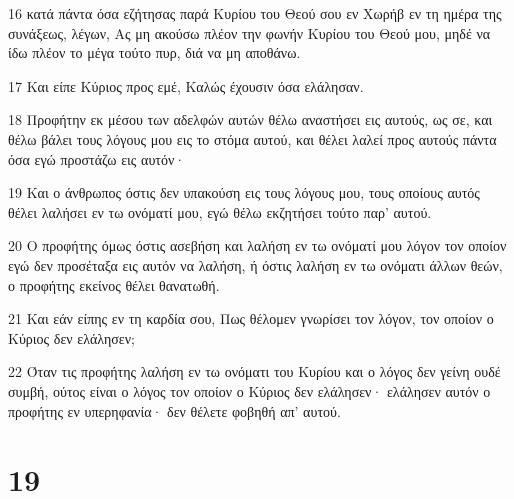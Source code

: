 \par 16 κατά πάντα όσα εζήτησας παρά Κυρίου του Θεού σου εν Χωρήβ εν τη ημέρα της συνάξεως, λέγων, Ας μη ακούσω πλέον την φωνήν Κυρίου του Θεού μου, μηδέ να ίδω πλέον το μέγα τούτο πυρ, διά να μη αποθάνω.
\par 17 Και είπε Κύριος προς εμέ, Καλώς έχουσιν όσα ελάλησαν.
\par 18 Προφήτην εκ μέσου των αδελφών αυτών θέλω αναστήσει εις αυτούς, ως σε, και θέλω βάλει τους λόγους μου εις το στόμα αυτού, και θέλει λαλεί προς αυτούς πάντα όσα εγώ προστάζω εις αυτόν·
\par 19 Και ο άνθρωπος όστις δεν υπακούση εις τους λόγους μου, τους οποίους αυτός θέλει λαλήσει εν τω ονόματί μου, εγώ θέλω εκζητήσει τούτο παρ' αυτού.
\par 20 Ο προφήτης όμως όστις ασεβήση και λαλήση εν τω ονόματί μου λόγον τον οποίον εγώ δεν προσέταξα εις αυτόν να λαλήση, ή όστις λαλήση εν τω ονόματι άλλων θεών, ο προφήτης εκείνος θέλει θανατωθή.
\par 21 Και εάν είπης εν τη καρδία σου, Πως θέλομεν γνωρίσει τον λόγον, τον οποίον ο Κύριος δεν ελάλησεν;
\par 22 Όταν τις προφήτης λαλήση εν τω ονόματι του Κυρίου και ο λόγος δεν γείνη ουδέ συμβή, ούτος είναι ο λόγος τον οποίον ο Κύριος δεν ελάλησεν· ελάλησεν αυτόν ο προφήτης εν υπερηφανία· δεν θέλετε φοβηθή απ' αυτού.

\chapter{19}

